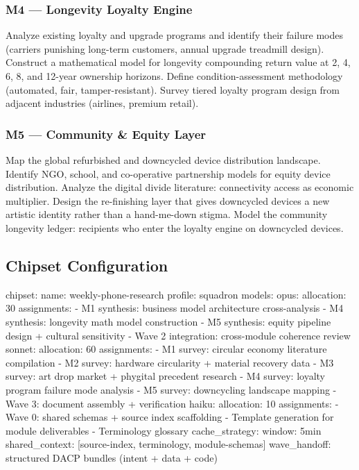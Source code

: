 \documentclass[11pt,letterpaper]{article}
\begin{document}
\subsubsection{M4 --- Longevity Loyalty Engine}
Analyze existing loyalty and upgrade programs and identify their failure modes (carriers punishing long-term customers, annual upgrade treadmill design). Construct a mathematical model for longevity compounding return value at 2, 4, 6, 8, and 12-year ownership horizons. Define condition-assessment methodology (automated, fair, tamper-resistant). Survey tiered loyalty program design from adjacent industries (airlines, premium retail).

\subsubsection{M5 --- Community \& Equity Layer}
Map the global refurbished and downcycled device distribution landscape. Identify NGO, school, and co-operative partnership models for equity device distribution. Analyze the digital divide literature: connectivity access as economic multiplier. Design the re-finishing layer that gives downcycled devices a new artistic identity rather than a hand-me-down stigma. Model the community longevity ledger: recipients who enter the loyalty engine on downcycled devices.

\subsection{Chipset Configuration}

\begin{asciibox}
chipset:
  name: weekly-phone-research
  profile: squadron
  models:
    opus:
      allocation: 30%
      assignments:
        - M1 synthesis: business model architecture cross-analysis
        - M4 synthesis: longevity math model construction
        - M5 synthesis: equity pipeline design + cultural sensitivity
        - Wave 2 integration: cross-module coherence review
    sonnet:
      allocation: 60%
      assignments:
        - M1 survey: circular economy literature compilation
        - M2 survey: hardware circularity + material recovery data
        - M3 survey: art drop market + phygital precedent research
        - M4 survey: loyalty program failure mode analysis
        - M5 survey: downcycling landscape mapping
        - Wave 3: document assembly + verification
    haiku:
      allocation: 10%
      assignments:
        - Wave 0: shared schemas + source index scaffolding
        - Template generation for module deliverables
        - Terminology glossary
  cache_strategy:
    window: 5min
    shared_context: [source-index, terminology, module-schemas]
    wave_handoff: structured DACP bundles (intent + data + code)
\end{asciibox}
\end{document}
